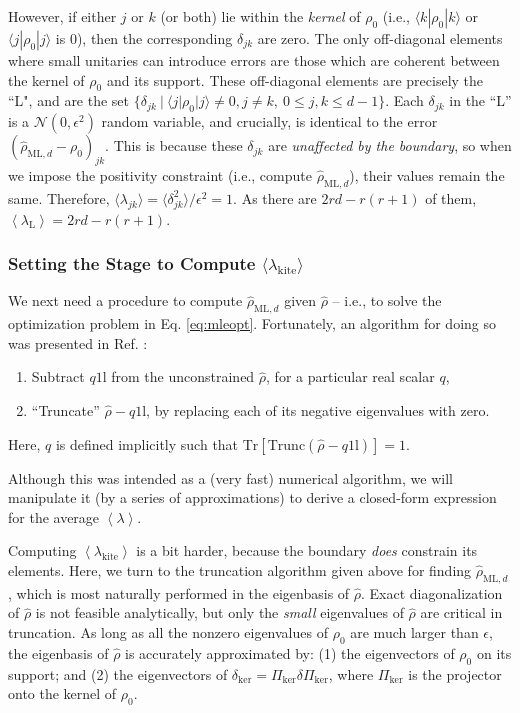 \documentclass[aps,pra, twocolumn]{revtex4-1}
\newcommand{\Tr}{\mathrm{Tr}}
\newcommand{\Id}{\mathbb{I}}
\newcommand{\expect}[1]{\ensuremath{\left\langle#1\right\rangle}}
\def\Id{1\!\mathrm{l}}
\newcommand{\rhohat}{\hat{\rho}}
\newcommand{\rhoML}[1]{\rhohat_{\scriptscriptstyle{\mathrm{ML},#1}}}
\begin{document}
However, if either $j$ or $k$ (or both) lie within the \emph{kernel} of $\rho_{0}$ (i.e., $\langle k | \rho_{0}| k \rangle$ or $\langle j|\rho_{0}|j\rangle$ is 0), then the corresponding $\delta_{jk}$ are zero. The only off-diagonal elements where small unitaries can introduce errors are those which are coherent between the kernel of $\rho_{0}$ and its support. These off-diagonal elements are precisely the ``L", and are  the set $\{\delta_{jk}~|~\langle j | \rho_{0}|j\rangle \neq 0, j\neq k, ~ 0 \leq j,k \leq d - 1\}$. Each $\delta_{jk}$ in the ``L'' is a $\mathcal{N}(0, \epsilon^{2})$ random variable, and crucially, is identical to the error $(\rhoML{d} - \rho_{0})_{jk}$. This is because these $\delta_{jk}$ are \emph{unaffected by the boundary}, so when we impose the positivity constraint (i.e., compute $\rhoML{d}$), their values remain the same. Therefore, $\langle \lambda_{jk}\rangle = \langle \delta_{jk}^{2}\rangle /\epsilon^{2} = 1$. As there are $2rd - r(r+1)$ of them, $\expect{\lambda_{\mathrm{L}}} = 2rd - r(r+1)$.

\subsubsection{Setting the Stage to Compute $\langle \lambda_\mathrm{kite}\rangle$}

We next need a procedure to compute $\rhoML{d}$ given $\rhohat$ -- i.e., to solve the optimization problem in Eq. \eqref{eq:mleopt}.  Fortunately, an algorithm for doing so was presented in Ref. \cite{Smolin2012}:
\begin{enumerate}[noitemsep]
\item Subtract $q\Id$ from the unconstrained $\hat\rho$, for a particular real scalar $q$,
\item ``Truncate'' $\hat\rho-q\Id$, by replacing each of its negative eigenvalues with zero.
\end{enumerate}
Here, $q$ is defined implicitly such that $\Tr\left[ \mathrm{Trunc}(\hat\rho-q\Id)\right] = 1$.

Although this was intended as a (very fast) numerical algorithm, we will manipulate it (by a series of approximations) to derive a closed-form expression for the average $\expect{\lambda}$.  

Computing $\expect{\lambda_{\mathrm{kite}}}$ is a bit harder, because the boundary \emph{does} constrain its elements.  Here, we turn to the truncation algorithm given above for finding $\rhoML{d}$, which is most naturally performed in the eigenbasis of $\hat\rho$.  Exact diagonalization of $\hat\rho$ is not feasible analytically, but only the \emph{small} eigenvalues of $\hat\rho$ are critical in truncation.  As long as all the nonzero eigenvalues of $\rho_0$ are much larger than $\epsilon$, the eigenbasis of $\hat\rho$ is accurately approximated by: (1) 
the eigenvectors of $\rho_0$ on its support; and (2) the eigenvectors of $\delta_{\mathrm{ker}} = \Pi_{\mathrm{ker}}\delta\Pi_{\mathrm{ker}}$, where $\Pi_{\mathrm{ker}}
$ is the projector onto the kernel of $\rho_0$.
\end{document}
